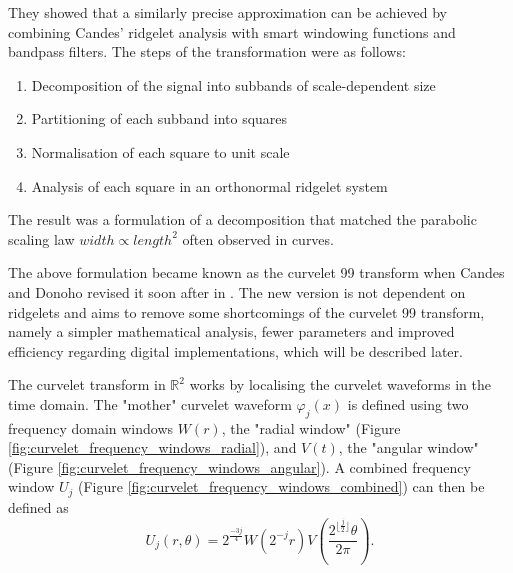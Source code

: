 They showed that a similarly precise approximation can be achieved by combining
Candes' ridgelet analysis \autocite{candes_ridgelets:_1998} with smart
windowing functions and bandpass filters. The steps of the transformation were
as follows:
\begin{enumerate}
    \item Decomposition of the signal into subbands of scale-dependent size
    \item Partitioning of each subband into squares
    \item Normalisation of each square to unit scale
    \item Analysis of each square in an orthonormal ridgelet system
\end{enumerate}

The result was a formulation of a decomposition that matched the parabolic
scaling law $width \propto length^2$ often observed in curves.

The above formulation became known as the curvelet 99 transform when Candes and
Donoho revised it soon after in \autocite{candes_new_2004}. The new version is
not dependent on ridgelets and aims to remove some shortcomings of the curvelet
99 transform, namely a simpler mathematical analysis, fewer parameters and
improved efficiency regarding digital implementations, which will be described
later.

The curvelet transform in $\mathbb{R}^2$ works by localising the curvelet
waveforms in the time domain. The "mother" curvelet waveform $\varphi_j(x)$ is
defined using two frequency domain windows $W(r)$, the "radial window" (Figure
\ref{fig:curvelet_frequency_windows_radial}), and $V(t)$, the "angular window"
(Figure \ref{fig:curvelet_frequency_windows_angular}). A combined frequency
window $U_j$ (Figure \ref{fig:curvelet_frequency_windows_combined}) can then be defined as
\begin{equation*}
    U_j(r, \theta) = 2^\frac{-3j}{4} W(2^{-j}r) V(\frac{2^{\lfloor\frac{j}{2}\rfloor}\theta}{2 \pi}).
\end{equation*}

